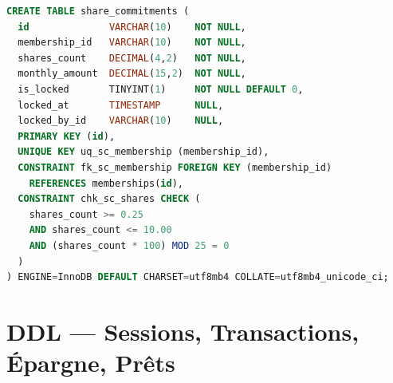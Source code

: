 \documentclass[12pt, a4paper]{report}
\begin{document}
\begin{lstlisting}[language=SQL, caption={Tables Membres \& Exercice}]
CREATE TABLE share_commitments (
  id              VARCHAR(10)    NOT NULL,
  membership_id   VARCHAR(10)    NOT NULL,
  shares_count    DECIMAL(4,2)   NOT NULL,
  monthly_amount  DECIMAL(15,2)  NOT NULL,
  is_locked       TINYINT(1)     NOT NULL DEFAULT 0,
  locked_at       TIMESTAMP      NULL,
  locked_by_id    VARCHAR(10)    NULL,
  PRIMARY KEY (id),
  UNIQUE KEY uq_sc_membership (membership_id),
  CONSTRAINT fk_sc_membership FOREIGN KEY (membership_id)
    REFERENCES memberships(id),
  CONSTRAINT chk_sc_shares CHECK (
    shares_count >= 0.25
    AND shares_count <= 10.00
    AND (shares_count * 100) MOD 25 = 0
  )
) ENGINE=InnoDB DEFAULT CHARSET=utf8mb4 COLLATE=utf8mb4_unicode_ci;
\end{lstlisting}

\section{DDL — Sessions, Transactions, Épargne, Prêts}
\end{document}
